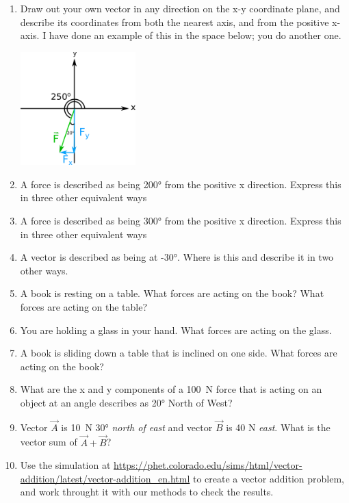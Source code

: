 \begin{enumerate}
\item 
Draw out your own vector in any direction on the x-y coordinate plane, and describe its coordinates from both the nearest axis, and from the positive x-axis. I have done an example of this in the space below; you do another one.

\includegraphics[width=1.75in]{week2-vector.png}\\

\item 
A force is described as being \ang{200} from the positive x direction. Express this in three other equivalent ways


\item
A force is described as being \ang{300} from the positive x direction. Express this in three other equivalent ways

\item A vector is described as being at \ang{ -30}. Where is this and describe it in two other ways.

 
\item A book is resting on a table. What forces are acting on the book? What forces are acting on the table?


\item You are holding a glass in your hand. What forces are acting on the glass.


\item A book is sliding down a table that is inclined on one side. What forces are acting on the book?


\item What are the x and y components of a \SI{100}{N} force that is acting on an object at an angle describes as \ang{20} North of West?\hugeskip

\item Vector $\vec{A}$ is \SI{10}{N} \ang{30} \emph{north of east} and vector $\vec{B}$ is 40 N \emph{east}. What is the vector sum of $\vec{A} + \vec{B}$?
\vspace{2in}

\item Use the simulation at \url{https://phet.colorado.edu/sims/html/vector-addition/latest/vector-addition_en.html} to create a vector addition problem, and work throught it with our methods to check the results.
\vspace{2in}


\end{enumerate}
